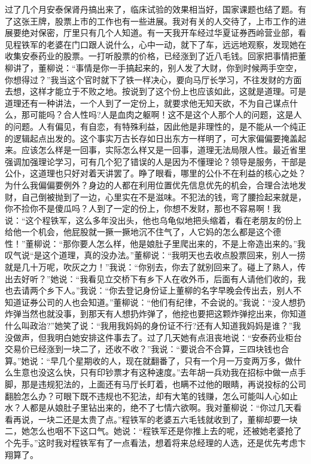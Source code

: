 \documentclass[12pt,oneside]{book}
\begin{document}
过了几个月安泰保肾丹搞出来了，临床试验的效果相当好，国家课题也结了题。有了这张王牌，股票上市的工作也有一些进展。我对有关的人交待了，上市工作的进展要绝对保密，厅里只有几个人知道。有一天我开车经过华夏证券西岭营业部，看见程铁军的老婆在门口跟人说什么，心中一动，就下了车，远远地观察，发现她在收集安泰药业的股票。一打听股票的价格，已经涨到了近八毛钱。回家把事情把董柳讲了，董柳说：``事情是你一手搞起来的，别人发了大财，你到时候两手空空，你想得过？''我当这个官时就下了铁一样决心，要向马厅长学习，不往发财的方面去想，这样才能立于不败之地。按说到了这个份上也应该如此，这就是道理。可是道理还有一种讲法，一个人到了一定份上，就要求他无知天欲，不为自己谋点什么，那可能吗？合人性吗?人是血肉之躯啊！这不是这个人那个人的问题，这是人的问题。人有偏见，有自恋，有特殊利益，因此他是非理性的，是不能从一个纯正的逻辑起点出发的。这个事实万古长存如日出东方一样明了，可大家偏偏要掩盖起来。应该怎么样是一回事，实际怎么样又是一回事，道理无法局限人性。最近省里强调加强理论学习，可有几个犯了错误的人是因为不懂理论？领导是服务，干部是公仆，这道理也只好对着天讲罢了。睁了眼看，哪里的公仆不在利益的核心之处？为什么我偏偏要例外？身边的人都在利用位置优先信息优先的机会，合理合法地发财，自己倒被抛到了一边，心里实在不是滋味。不犯法的钱，弯了腰捡起来就是，你不捡你不是傻瓜吗？人到了一定的份上，你想不发财，那也不容易啊！我说：``这个程铁军，这么多年没出头，他也乌龟似地把头缩着，看在老朋友的份上给他一个机会，他屁股就一撅一撅地沉不住气了，人它妈的怎么都是这个德性！''董柳说：``那你要人怎么样，他是娘肚子里爬出来的，不是上帝造出来的。''我叹气说``是这个道理，真的没办法。''董柳说：``我明天也去收点股票回来，别人一捞就是几十万呢，吹灰之力！''我说：``你别去，你去了就别回来了。碰上了熟人，传出去好听？''她说：``我看见立交桥下有乡下人在收外币，后面有人请他们收的，我也去请两个乡下人。''我说：``你去登记身份证上董柳的名字早晚会传出去，别人不知道证券公司的人也会知道。''董柳说：``他们有纪律，不会说的。''我说：``没人想扔炸弹当然也就没事，到那天有人想扔炸弹了，他挖也要把这颗炸弹挖出来，你知道什么叫政治?''她笑了说：``我用我妈妈的身份证不行?还有人知道我妈妈是谁？''我没做声，但我明白她安排这件事去了。过了几天她有点沮丧地说：``安泰药业柜台交易价已经涨到一块二了，还收不收？''我说：``要说合不合算，三四块钱也合算。''她说：``早几个星期收的人，现在就翻番了，只有一个月一万变两万多，做什么生意也没这么快，只有印钞票才有这种速度。''去年胡一兵劝我在招标中做一点手脚，那是违规犯法的，上面还有马厅长盯着，也瞒不过他的眼睛，再说投标的公司翻脸怎么办？可眼下既不违规也不犯法，却有大笔的钱赚，怎么可能叫人心如止水？人都是从娘肚子里钻出来的，绝不了七情六欲啊。我对董柳说：``你过几天看看再说，一块二还是太贵了点。''程铁军的老婆五六毛钱就收到了，董柳却要一块二，她怎么也咽不下这口气。她说：``程铁军还是你推上去的呢，还被她老婆抢了个先手。''这时我对程铁军有了一点看法，想着将来总经理的人选，还是优先考虑卞翔算了。
\end{document}
